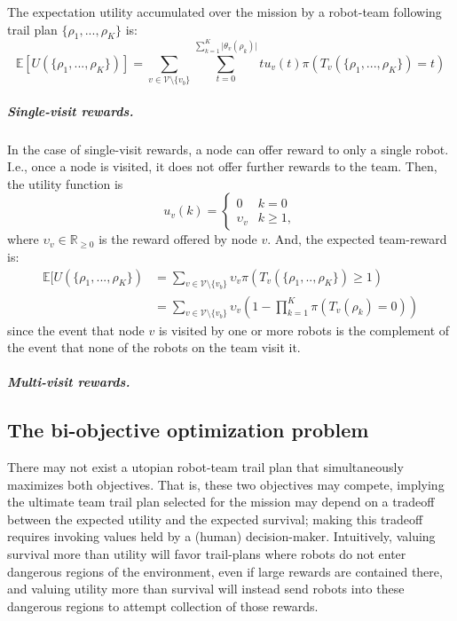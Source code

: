 \documentclass[11pt, oneside]{article}
\begin{document}
The expectation utility accumulated over the mission by a robot-team following trail plan $\{\rho_1, ..., \rho_K\}$ is:
\begin{equation}
	\mathbb{E}[U(\{\rho_1,...,\rho_K\})]= \sum_{v\in\mathcal{V}\setminus \{v_b\}} \sum_{t= 0}^{\sum_{k=1}^K \lvert \theta_v(\rho_k) \rvert } t u_v(t) \pi(T_v(\{\rho_1, ..., \rho_K\}) = t)
\end{equation}

\subparagraph{Single-visit rewards.}
In the case of single-visit rewards, a node can offer reward to only a single robot. I.e., once a node is visited, it does not offer further rewards to the team. Then, the utility function is
\begin{equation}
	u_v(k) = \begin{cases}
		0 & k = 0 \\
		\upsilon_v & k \geq 1,
	\end{cases}
\end{equation} where $\upsilon_v \in \mathbb{R}_{\geq 0}$ is the reward offered by node $v$. And, the expected team-reward is:
\begin{align}
	\mathbb{E}[U(\{\rho_1, ..., \rho_K\}) & = \sum_{v \in \mathcal{V} \setminus \{v_b\}} \upsilon_v \pi(T_v(\{\rho_1, .., \rho_K\}) \geq 1) \\
		      & = \sum_{v \in \mathcal{V} \setminus \{v_b\}} \upsilon_v \left(1 - \prod_{k=1}^K  \pi(T_v(\rho_k) =0) \right)
\end{align} since the event that node $v$ is visited by one or more robots is the complement of the event that none of the robots on the team visit it.

\subparagraph{Multi-visit rewards.}

\subsection{The bi-objective optimization problem}


There may not exist a utopian robot-team trail plan that simultaneously maximizes both objectives. 
That is, these two objectives may compete, implying the ultimate team trail plan selected for the mission may depend on a tradeoff between the expected utility and the expected survival; making this tradeoff requires invoking values held by a (human) decision-maker. Intuitively, valuing survival more than utility will favor trail-plans where robots do not enter dangerous regions of the environment, even if large rewards are contained there, and valuing utility more than survival will instead send robots into these dangerous regions to attempt collection of those rewards. 
\end{document}
